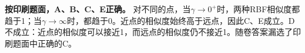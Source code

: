 \textbf{按印刷题面，A、B、C、E正确。} 对不同的点，当\(\gamma\to0^+\)时，两种RBF相似度都趋于1；当\(\gamma\to\infty\)时，都趋于0。近点的相似度始终高于远点，因此C、E成立。D不成立：近点的相似度可以接近1，而远点的相似度仍不接近1。随卷答案漏选了印刷题面中正确的C。
